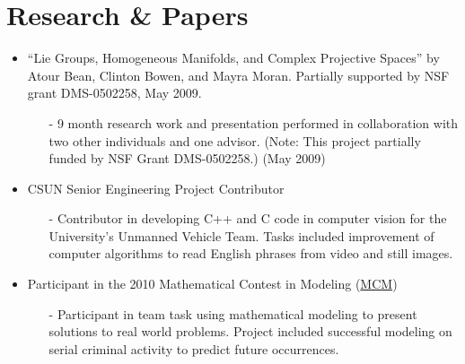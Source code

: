 \documentclass[12pt,table]{article}
\begin{document}
\section*{\sffamily Research \& Papers}
\begin{itemize}
\item ``Lie Groups, Homogeneous Manifolds, and Complex Projective Spaces'' by Atour Bean, Clinton Bowen, and Mayra Moran. Partially supported by NSF grant DMS-0502258, May 2009.
	\begin{itemize}
		\item[-]9 month research work and presentation performed in collaboration with two other
individuals and one advisor. (Note: This project partially funded by NSF Grant DMS-0502258.)
(May 2009)
\end{itemize}
\item CSUN Senior Engineering Project Contributor
	\begin{itemize}
		\item[-]Contributor in developing C++ and C code in computer vision for the University's
Unmanned Vehicle Team. Tasks included improvement of computer algorithms to read English phrases
from video and still images.
	\end{itemize}
\item Participant in the 2010 Mathematical Contest in Modeling
(\href{http://www.comap.com/undergraduate/contests/mcm/}{MCM})
	\begin{itemize}
		\item[-]Participant in team task using mathematical modeling to present solutions to real
world problems. Project included successful modeling on serial criminal activity to predict future
occurrences.
	\end{itemize}
\end{itemize}
\end{document}
